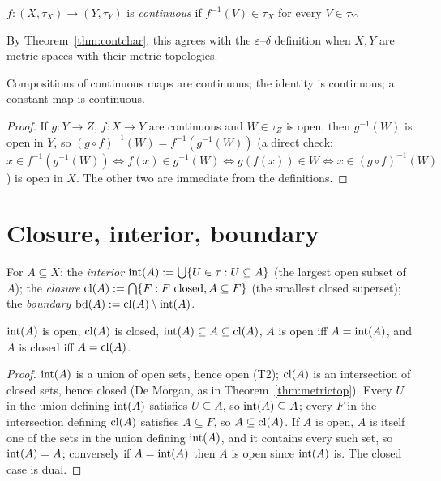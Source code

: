 \begin{definition}
	$f:(X,\tau_X)\to(Y,\tau_Y)$ is \emph{continuous} if $f^{-1}(V)\in\tau_X$ for every $V\in\tau_Y$.
\end{definition}

By Theorem~\ref{thm:contchar}, this agrees with the $\varepsilon$--$\delta$ definition when $X,Y$ are metric spaces with their metric topologies.

\begin{proposition}
	Compositions of continuous maps are continuous; the identity is continuous; a constant map is continuous.
\end{proposition}
\begin{proof}
	If $g:Y\to Z$, $f:X\to Y$ are continuous and $W\in\tau_Z$ is open, then $g^{-1}(W)$ is open in $Y$, so $(g\circ f)^{-1}(W)=f^{-1}(g^{-1}(W))$ (a direct check: $x\in f^{-1}(g^{-1}(W))\iff f(x)\in g^{-1}(W)\iff g(f(x))\in W\iff x\in(g\circ f)^{-1}(W)$) is open in $X$. The other two are immediate from the definitions.
\end{proof}

\section{Closure, interior, boundary}

\begin{definition}
	For $A\subseteq X$: the \emph{interior} $\operatorname{int}(A):=\bigcup\{U\in\tau:U\subseteq A\}$ (the largest open subset of $A$); the \emph{closure} $\operatorname{cl}(A):=\bigcap\{F:F\text{ closed},A\subseteq F\}$ (the smallest closed superset); the \emph{boundary} $\operatorname{bd}(A):=\operatorname{cl}(A)\setminus\operatorname{int}(A)$.
\end{definition}

\begin{proposition}
	$\operatorname{int}(A)$ is open, $\operatorname{cl}(A)$ is closed, $\operatorname{int}(A)\subseteq A\subseteq\operatorname{cl}(A)$, $A$ is open iff $A=\operatorname{int}(A)$, and $A$ is closed iff $A=\operatorname{cl}(A)$.
\end{proposition}
\begin{proof}
	$\operatorname{int}(A)$ is a union of open sets, hence open (T2); $\operatorname{cl}(A)$ is an intersection of closed sets, hence closed (De Morgan, as in Theorem~\ref{thm:metrictop}). Every $U$ in the union defining $\operatorname{int}(A)$ satisfies $U\subseteq A$, so $\operatorname{int}(A)\subseteq A$; every $F$ in the intersection defining $\operatorname{cl}(A)$ satisfies $A\subseteq F$, so $A\subseteq\operatorname{cl}(A)$. If $A$ is open, $A$ is itself one of the sets in the union defining $\operatorname{int}(A)$, and it contains every such set, so $\operatorname{int}(A)=A$; conversely if $A=\operatorname{int}(A)$ then $A$ is open since $\operatorname{int}(A)$ is. The closed case is dual.
\end{proof}


